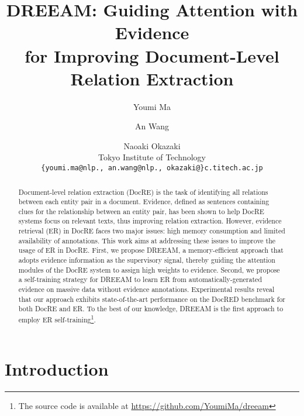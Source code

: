 \documentclass[11pt]{article}
\title{DREEAM: Guiding Attention with Evidence \\for Improving Document-Level Relation Extraction}
\author{Youmi Ma \and An Wang \and Naoaki Okazaki \\
Tokyo Institute of Technology \\
\texttt{\{youmi.ma@nlp., an.wang@nlp., okazaki@\}c.titech.ac.jp} \\
}
\begin{document}
\maketitle
\begin{abstract}

Document-level relation extraction (DocRE) is the task of identifying all relations between each entity pair in a document.
Evidence, defined as sentences containing clues for the relationship between an entity pair, has been shown to help DocRE systems focus on relevant texts, thus improving relation extraction.
However, evidence retrieval (ER) in DocRE faces two major issues: high memory consumption and limited availability of annotations.
This work aims at addressing these issues to improve the usage of ER in DocRE.
First, we propose DREEAM, a memory-efficient approach that adopts evidence information as the supervisory signal, thereby guiding the attention modules of the DocRE system to assign high weights to evidence.
Second, we propose a self-training strategy for DREEAM to learn ER from automatically-generated evidence on massive data without evidence annotations.
Experimental results reveal that our approach exhibits state-of-the-art performance on the DocRED benchmark for both DocRE and ER.
To the best of our knowledge, DREEAM is the first approach to employ ER self-training\footnote{The source code is available at \url{https://github.com/YoumiMa/dreeam}}.



\end{abstract}

\section{Introduction}
\end{document}
